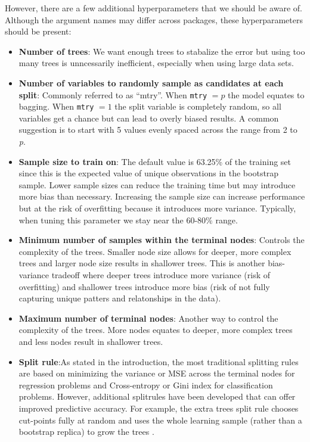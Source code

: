 \documentclass[]{book}
\providecommand{\tightlist}{%
  \setlength{\itemsep}{0pt}\setlength{\parskip}{0pt}}
\theoremstyle{definition}
\theoremstyle{definition}
\theoremstyle{definition}
\theoremstyle{remark}
\begin{document}
However, there are a few additional hyperparameters that we should be
aware of. Although the argument names may differ across packages, these
hyperparameters should be present:

\begin{itemize}
\tightlist
\item
  \textbf{Number of trees}: We want enough trees to stabalize the error
  but using too many trees is unncessarily inefficient, especially when
  using large data sets.
\item
  \textbf{Number of variables to randomly sample as candidates at each
  split}: Commonly referred to as ``mtry''. When \texttt{mtry} \(=p\)
  the model equates to bagging. When \texttt{mtry} \(=1\) the split
  variable is completely random, so all variables get a chance but can
  lead to overly biased results. A common suggestion is to start with 5
  values evenly spaced across the range from 2 to \emph{p}.
\item
  \textbf{Sample size to train on}: The default value is 63.25\% of the
  training set since this is the expected value of unique observations
  in the bootstrap sample. Lower sample sizes can reduce the training
  time but may introduce more bias than necessary. Increasing the sample
  size can increase performance but at the risk of overfitting because
  it introduces more variance. Typically, when tuning this parameter we
  stay near the 60-80\% range.
\item
  \textbf{Minimum number of samples within the terminal nodes}: Controls
  the complexity of the trees. Smaller node size allows for deeper, more
  complex trees and larger node size results in shallower trees. This is
  another bias-variance tradeoff where deeper trees introduce more
  variance (risk of overfitting) and shallower trees introduce more bias
  (risk of not fully capturing unique patters and relatonships in the
  data).
\item
  \textbf{Maximum number of terminal nodes}: Another way to control the
  complexity of the trees. More nodes equates to deeper, more complex
  trees and less nodes result in shallower trees.
\item
  \textbf{Split rule}:As stated in the introduction, the most
  traditional splitting rules are based on minimizing the variance or
  MSE across the terminal nodes for regression problems and
  Cross-entropy or Gini index for classification problems. However,
  additional splitrules have been developed that can offer improved
  predictive accuracy. For example, the extra trees split rule chooses
  cut-points fully at random and uses the whole learning sample (rather
  than a bootstrap replica) to grow the trees
  \citep{geurts2006extremely}.
\end{itemize}
\end{document}
